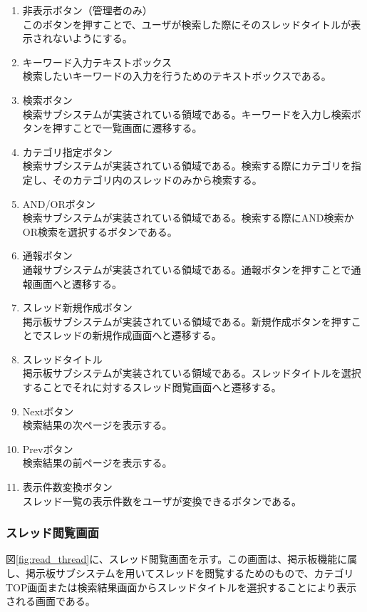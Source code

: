 \documentclass[a4j]{jarticle}
\begin{document}
\begin{enumerate}
  \renewcommand{\labelenumi}{\textcircled{\scriptsize \theenumi}}
\item 非表示ボタン（管理者のみ）\\
このボタンを押すことで、ユーザが検索した際にそのスレッドタイトルが表示されないようにする。
\item キーワード入力テキストボックス\\
検索したいキーワードの入力を行うためのテキストボックスである。
\item 検索ボタン\\
検索サブシステムが実装されている領域である。キーワードを入力し検索ボタンを押すことで一覧画面に遷移する。
\item カテゴリ指定ボタン\\
検索サブシステムが実装されている領域である。検索する際にカテゴリを指定し、そのカテゴリ内のスレッドのみから検索する。
\item AND/ORボタン\\
検索サブシステムが実装されている領域である。検索する際にAND検索かOR検索を選択するボタンである。
\item 通報ボタン\\
通報サブシステムが実装されている領域である。通報ボタンを押すことで通報画面へと遷移する。
\item スレッド新規作成ボタン\\
掲示板サブシステムが実装されている領域である。新規作成ボタンを押すことでスレッドの新規作成画面へと遷移する。
\item スレッドタイトル\\
掲示板サブシステムが実装されている領域である。スレッドタイトルを選択することでそれに対するスレッド閲覧画面へと遷移する。
\item Nextボタン\\
検索結果の次ページを表示する。
\item Prevボタン\\
検索結果の前ページを表示する。
\item 表示件数変換ボタン\\
スレッド一覧の表示件数をユーザが変換できるボタンである。

\end{enumerate}

\subsubsection{スレッド閲覧画面}
図\ref{fig:read_thread}に、スレッド閲覧画面を示す。この画面は、掲示板機能に属し、掲示板サブシステムを用いてスレッドを閲覧するためのもので、カテゴリTOP画面または検索結果画面からスレッドタイトルを選択することにより表示される画面である。
\end{document}
